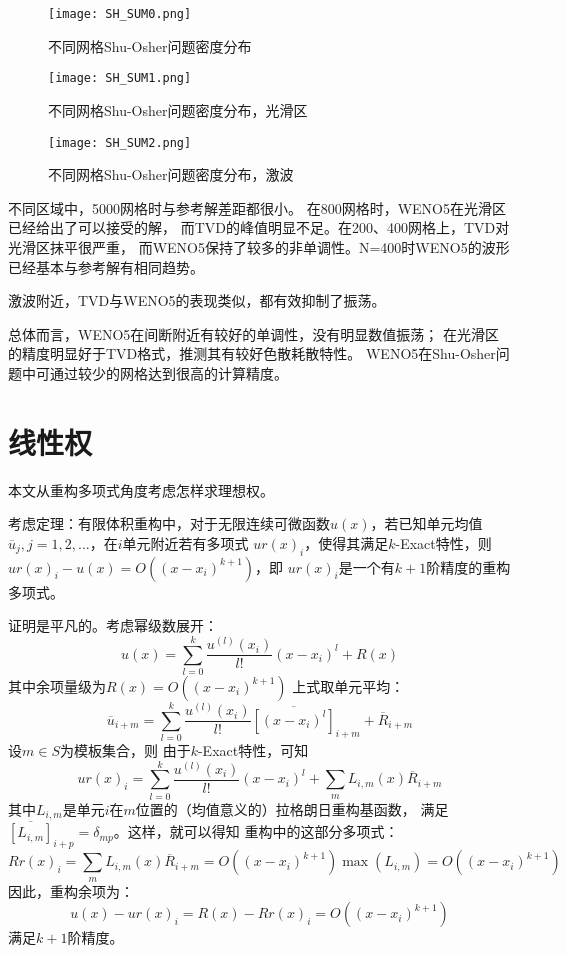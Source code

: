 \documentclass[UTF8,zihao=5]{ctexart} %
\newcommand*{\mean}[1]{\overline{#1}}
\begin{document}
\begin{figure}[H]
    \centering
    \texttt{[image: SH\_SUM0.png]}  %
    \caption{不同网格Shu-Osher问题密度分布}
\end{figure}

\begin{figure}[H]
    \centering
    \texttt{[image: SH\_SUM1.png]}  %
    \caption{不同网格Shu-Osher问题密度分布，光滑区}
\end{figure}

\begin{figure}[H]
    \centering
    \texttt{[image: SH\_SUM2.png]}  %
    \caption{不同网格Shu-Osher问题密度分布，激波}
\end{figure}

不同区域中，5000网格时与参考解差距都很小。
在800网格时，WENO5在光滑区已经给出了可以接受的解，
而TVD的峰值明显不足。在200、400网格上，TVD对光滑区抹平很严重，
而WENO5保持了较多的非单调性。N=400时WENO5的波形已经基本与参考解有相同趋势。

激波附近，TVD与WENO5的表现类似，都有效抑制了振荡。

总体而言，WENO5在间断附近有较好的单调性，没有明显数值振荡；
在光滑区的精度明显好于TVD格式，推测其有较好色散耗散特性。
WENO5在Shu-Osher问题中可通过较少的网格达到很高的计算精度。

\section{线性权}

本文从重构多项式角度考虑怎样求理想权。

考虑定理：有限体积重构中，对于无限连续可微函数$u(x)$，若已知单元均值
$\mean{u}_j,j=1,2,...$，在$i$单元附近若有多项式
$ur(x)_i$，使得其满足$k$-Exact特性，则$ur(x)_i-u(x)=O((x-x_i)^{k+1})$，即
$ur(x)_i$是一个有$k+1$阶精度的重构多项式。

证明是平凡的。考虑幂级数展开：
$$
u(x)=\sum_{l=0}^{k}{\frac{u^{(l)}(x_i)}{l!}(x-x_i)^l} + R(x)
$$
其中余项量级为$R(x)=O((x-x_i)^{k+1})$
上式取单元平均：
$$
\mean{u}_{i+m}=\sum_{l=0}^{k}{\frac{u^{(l)}(x_i)}{l!}\mean{[(x-x_i)^l]}_{i+m}} + \mean{R}_{i+m}
$$
设$m\in S$为模板集合，则
由于$k$-Exact特性，可知
$$
ur(x)_i = \sum_{l=0}^{k}{\frac{u^{(l)}(x_i)}{l!}(x-x_i)^l} + \sum_m{L_{i,m}(x)\mean{R}_{i+m}}
$$
其中$L_{i,m}$是单元$i$在$m$位置的（均值意义的）拉格朗日重构基函数，
满足$\mean{[L_{i,m}]}_{i+p} = \delta_{mp}$。这样，就可以得知
重构中的这部分多项式：
$$
Rr(x)_i = \sum_m{L_{i,m}(x)\mean{R}_{i+m}} = O((x-x_i)^{k+1})\max(L_{i,m})
=O((x-x_i)^{k+1})
$$
因此，重构余项为：
$$
u(x) - ur(x)_i = R(x) - Rr(x)_i = O((x-x_i)^{k+1})
$$
满足$k+1$阶精度。
\end{document}
